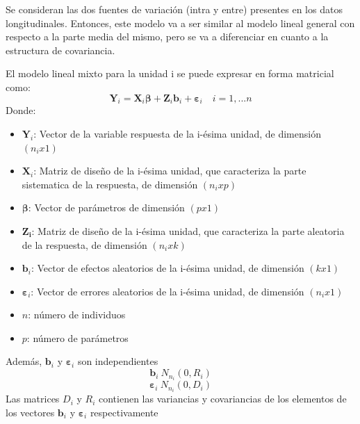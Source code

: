 \documentclass[12pt]{article}
\begin{document}
Se consideran las dos fuentes de variación (intra y entre) presentes en los datos longitudinales. Entonces, este modelo va 
a ser similar al modelo lineal general con respecto a la parte media del mismo, pero se va a diferenciar en cuanto a la 
estructura de covariancia.

El modelo lineal mixto para la unidad i se puede expresar en forma matricial como:
\[ \bm{Y}_i = \bm{X}_i\bm{\beta} + \bm{Z}_i\bm{b}_i + \bm{\varepsilon}_i \quad i = 1, ... n \]
Donde:
\begin{itemize}
	\item $\bm{Y}_i$: Vector de la variable respuesta de la i-ésima unidad, de dimensión $(n_ix1)$
	\item $\bm{X}_i$: Matriz de diseño de la i-ésima unidad, que caracteriza la parte sistematica de la respuesta, 
	de dimensión $(n_ixp)$
	\item $\bm{\beta}$: Vector de parámetros de dimensión $(px1)$
	\item $\bm{Z_i}$: Matriz de diseño de la i-ésima unidad, que caracteriza la parte aleatoria de la respuesta, 
	de dimensión $(n_ixk)$
	\item $\bm{b}_i$: Vector de efectos aleatorios de la i-ésima unidad, de dimensión $(kx1)$
	\item $\bm{\varepsilon}_i$: Vector de errores aleatorios de la i-ésima unidad, de dimensión $(n_ix1)$
	\item $n$: número de individuos
	\item $p$: número de parámetros
\end{itemize}
Además, $\bm{b}_i$ y $\bm{\varepsilon}_i$ son independientes 
\[ \bm{b}_i ~ N_{n_i}(0, R_i) \]
\[ \bm{\varepsilon}_i ~ N_{n_i}(0, D_i) \]
Las matrices $D_i$ y $R_i$ contienen las variancias y covariancias de los elementos de los vectores 
$\bm{b}_i$ y $\bm{\varepsilon}_i$ respectivamente
\end{document}

